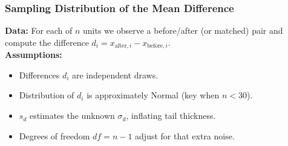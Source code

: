 \documentclass[handout]{beamer}
\begin{document}
\begin{frame}
\frametitle{Sampling Distribution of the Mean Difference}
\textbf{Data:} For each of \(n\) units we observe a before/after (or matched) pair and compute the difference \(d_i = x_{\text{after},i} - x_{\text{before},i}\).\\[0.5em]
\textbf{Assumptions:}
\begin{itemize}
  \item Differences \(d_i\) are independent draws.
  \item Distribution of \(d_i\) is approximately Normal (key when \(n<30\)).
\end{itemize}
\vspace{0.5em}

\begin{itemize}
  \item \(s_d\) estimates the unknown \(\sigma_d\), inflating tail thickness.
  \item Degrees of freedom \(df=n-1\) adjust for that extra noise.
\end{itemize}
\end{frame}
\end{document}
